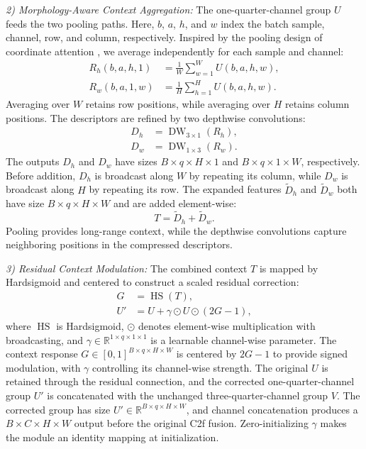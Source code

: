 \documentclass[journal]{IEEEtranTIE}
\begin{document}
\emph{2) Morphology-Aware Context Aggregation:}
The one-quarter-channel group $U$ feeds the two pooling paths. Here, $b$, $a$, $h$, and $w$ index the batch sample, channel, row, and column, respectively. Inspired by the pooling design of coordinate attention \cite{hou2021coordinate}, we average independently for each sample and channel:
\begin{align}
R_h(b,a,h,1) &= \frac{1}{W}\sum_{w=1}^{W}U(b,a,h,w), \label{eq:pac-row}\\
R_w(b,a,1,w) &= \frac{1}{H}\sum_{h=1}^{H}U(b,a,h,w). \label{eq:pac-column}
\end{align}
Averaging over $W$ retains row positions, while averaging over $H$ retains column positions. The descriptors are refined by two depthwise convolutions:
\begin{equation}
\begin{aligned}
D_h&=\operatorname{DW}_{3\times1}(R_h),\\
D_w&=\operatorname{DW}_{1\times3}(R_w).
\end{aligned}
\label{eq:pac-depthwise}
\end{equation}
The outputs $D_h$ and $D_w$ have sizes $B\times q\times H\times1$ and $B\times q\times1\times W$, respectively. Before addition, $D_h$ is broadcast along $W$ by repeating its column, while $D_w$ is broadcast along $H$ by repeating its row. The expanded features $\widetilde D_h$ and $\widetilde D_w$ both have size $B\times q\times H\times W$ and are added element-wise:
\begin{equation}
T=\widetilde D_h+\widetilde D_w.
\label{eq:pac-context}
\end{equation}
Pooling provides long-range context, while the depthwise convolutions capture neighboring positions in the compressed descriptors.

\emph{3) Residual Context Modulation:}
The combined context $T$ is mapped by Hardsigmoid and centered to construct a scaled residual correction:
\begin{align}
G &= \operatorname{HS}(T), \label{eq:pac-map}\\
U' &= U+\gamma\odot U\odot(2G-1), \label{eq:pac-modulation}
\end{align}
where $\operatorname{HS}$ is Hardsigmoid, $\odot$ denotes element-wise multiplication with broadcasting, and $\gamma\in\mathbb{R}^{1\times q\times1\times1}$ is a learnable channel-wise parameter. The context response $G\in[0,1]^{B\times q\times H\times W}$ is centered by $2G-1$ to provide signed modulation, with $\gamma$ controlling its channel-wise strength. The original $U$ is retained through the residual connection, and the corrected one-quarter-channel group $U'$ is concatenated with the unchanged three-quarter-channel group $V$. The corrected group has size $U'\in\mathbb{R}^{B\times q\times H\times W}$, and channel concatenation produces a $B\times C\times H\times W$ output before the original C2f fusion. Zero-initializing $\gamma$ makes the module an identity mapping at initialization.
\end{document}
